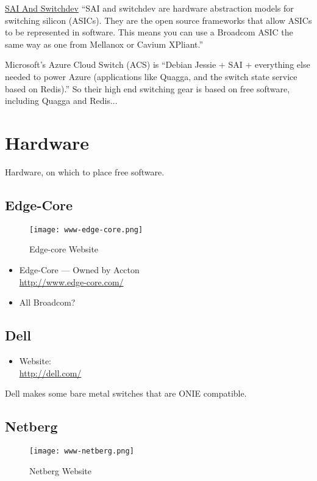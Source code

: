 \href{http://packetpushers.net/sai-and-switchdev-need-to-succeed/}{SAI And Switchdev}
``SAI and switchdev are hardware abstraction models for switching silicon (ASICs). They are the open source frameworks that allow ASICs to be represented in software. This means you can use a Broadcom ASIC the same way as one from Mellanox or Cavium XPliant.''

Microsoft's Azure Cloud Switch (ACS) is ``Debian Jessie + SAI + everything else needed to power Azure (applications like Quagga, and the switch state service based on Redis).'' So their high end switching gear is based on free software, including Quagga and Redis...


\section{Hardware}
Hardware, on which to place free software.


\subsection{Edge-Core}
\begin{figure}[h!]
\texttt{[image: www-edge-core.png]}
 \caption{Edge-core Website}
 \label{fig:www-edge-core}
\end{figure}


\begin{itemize}
 \item Edge-Core --- Owned by Accton \\ \url{http://www.edge-core.com/}
 \item All Broadcom?
\end{itemize}


\subsection{Dell}
\begin{itemize}
 \item Website: \\ \url{http://dell.com/}
\end{itemize}

Dell makes some bare metal switches that are ONIE compatible.


\subsection{Netberg}
\begin{figure}[h!]
\texttt{[image: www-netberg.png]}
 \caption{Netberg Website}
 \label{fig:www-netberg}
\end{figure}


